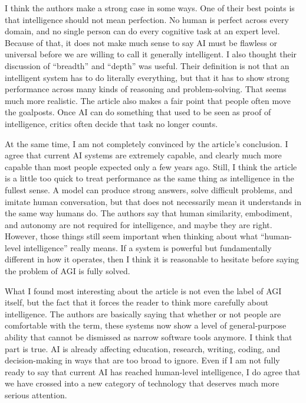 \documentclass{article}
\begin{document}
I think the authors make a strong case in some ways. One of their best points is that intelligence should not mean perfection. No human is perfect across every domain, and no single person can do every cognitive task at an expert level. Because of that, it does not make much sense to say AI must be flawless or universal before we are willing to call it generally intelligent. I also thought their discussion of “breadth” and “depth” was useful. Their definition is not that an intelligent system has to do literally everything, but that it has to show strong performance across many kinds of reasoning and problem-solving. That seems much more realistic. The article also makes a fair point that people often move the goalposts. Once AI can do something that used to be seen as proof of intelligence, critics often decide that task no longer counts.

At the same time, I am not completely convinced by the article’s conclusion. I agree that current AI systems are extremely capable, and clearly much more capable than most people expected only a few years ago. Still, I think the article is a little too quick to treat performance as the same thing as intelligence in the fullest sense. A model can produce strong answers, solve difficult problems, and imitate human conversation, but that does not necessarily mean it understands in the same way humans do. The authors say that human similarity, embodiment, and autonomy are not required for intelligence, and maybe they are right. However, those things still seem important when thinking about what “human-level intelligence” really means. If a system is powerful but fundamentally different in how it operates, then I think it is reasonable to hesitate before saying the problem of AGI is fully solved.

What I found most interesting about the article is not even the label of AGI itself, but the fact that it forces the reader to think more carefully about intelligence. The authors are basically saying that whether or not people are comfortable with the term, these systems now show a level of general-purpose ability that cannot be dismissed as narrow software tools anymore. I think that part is true. AI is already affecting education, research, writing, coding, and decision-making in ways that are too broad to ignore. Even if I am not fully ready to say that current AI has reached human-level intelligence, I do agree that we have crossed into a new category of technology that deserves much more serious attention.
\end{document}

